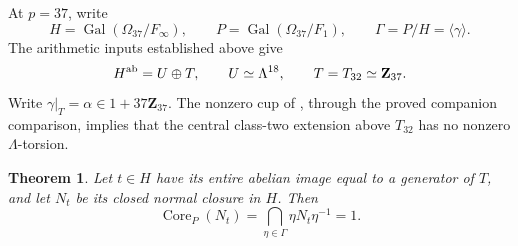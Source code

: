 \documentclass[11pt]{article}
\newtheorem{theorem}{Theorem}[section]
\theoremstyle{definition}\newtheorem{definition}[theorem]{Definition}
\begin{document}
At \(p=37\), write
\[
 H=\operatorname{Gal}(\Omega_{37}/F_\infty),\qquad
 P=\operatorname{Gal}(\Omega_{37}/F_1),\qquad
 \Gamma=P/H=\langle\gamma\rangle.
\]
The arithmetic inputs established above give
\[
 H^{\rm ab}=U\oplus T,\qquad U\simeq\Lambda^{18},
 \qquad T=T_{32}\simeq\mathbf Z_{37}.
\]
Write \(\gamma|_T=\alpha\in1+37\mathbf Z_{37}\).
The nonzero cup of \cite[Theorem~7.5, p.~20; Corollary~8.3, p.~23]{MS}, through the proved
companion comparison, implies that the central class-two
extension above \(T_{32}\) has no nonzero \(\Lambda\)-torsion.

\begin{theorem}\label{thm:p37-cyclotomic-core}
Let \(t\in H\) have its entire abelian image equal to a generator
of \(T\), and let \(N_t\) be its closed normal closure in \(H\).
Then
\[
 \operatorname{Core}_{P}(N_t)
   =\bigcap_{\eta\in\Gamma}\eta N_t\eta^{-1}=1.
\]
\end{theorem}
\end{document}
